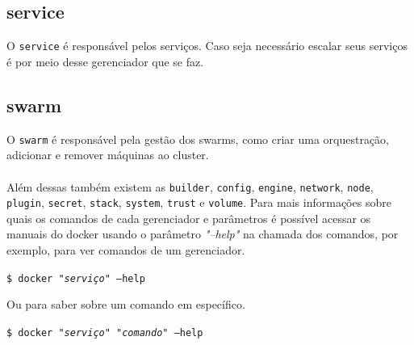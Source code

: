 \documentclass[twocolumn, letterpaper]{scrartcl}
\begin{document}
\subsection*{\color{triton_blue}service}
O \texttt{service} é responsável pelos serviços. Caso seja necessário escalar seus serviços é por meio desse gerenciador que se faz.\\
\indent{}
\subsection*{\color{triton_blue}swarm}
O \texttt{swarm} é responsável pela gestão dos swarms, como criar uma orquestração, adicionar e remover máquinas ao cluster.\\
\indent{}
\vspace{20px}\\
Além dessas também existem as \texttt{builder}, \texttt{config}, \texttt{engine}, \texttt{network}, \texttt{node}, \texttt{plugin}, \texttt{secret}, \texttt{stack}, \texttt{system}, \texttt{trust} e \texttt{volume}. Para mais informações sobre quais os comandos de cada gerenciador e parâmetros é possível acessar os manuais do docker usando o parâmetro \textit{"--help"} na chamada dos comandos, por exemplo, para ver comandos de um gerenciador.
\begin{center}
    \texttt{\$ docker \textit{"serviço"} --help}
\end{center}
Ou para saber sobre um comando em específico.
\begin{center}
    \texttt{\$ docker \textit{"serviço"} \textit{"comando"} --help}
\end{center}
\end{document}
